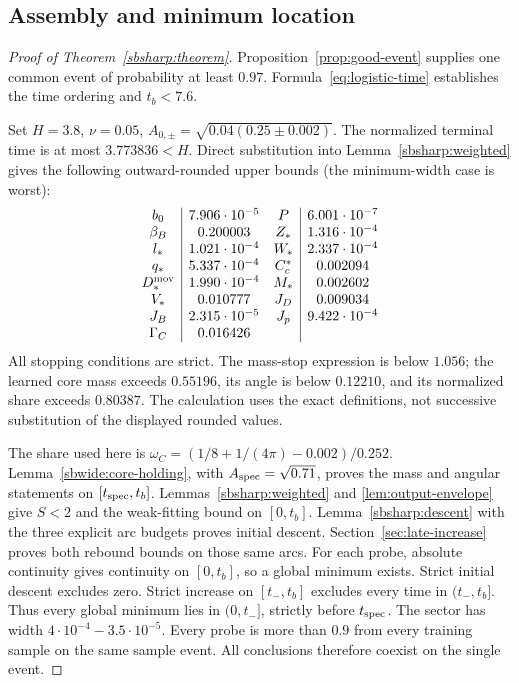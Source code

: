 \documentclass[10pt]{article}
\theoremstyle{remark}\newtheorem{remark}[theorem]{Remark}
\begin{document}
\subsection{Assembly and minimum location}

\begin{proof}[Proof of Theorem~\ref{sbsharp:theorem}]

Proposition~\ref{prop:good-event} supplies one common event of probability
at least $0.97$. Formula~\eqref{eq:logistic-time} establishes the time
ordering and $t_b<7.6$.

Set $H=3.8$, $\nu=0.05$, $A_{0,\pm}=\sqrt{0.04(0.25\pm0.002)}$.
The normalized terminal time is at most $3.773836<H$. Direct
substitution into Lemma~\ref{sbsharp:weighted} gives the following
outward-rounded upper bounds (the minimum-width case is worst):
\[
\begin{array}{c|c@{\quad}c|c}
 b_0&7.906\cdot10^{-5}&P&6.001\cdot10^{-7}\\
 \beta_B&0.200003&Z_*&1.316\cdot10^{-4}\\
 l_*&1.021\cdot10^{-4}&W_*&2.337\cdot10^{-4}\\
 q_*&5.337\cdot10^{-4}&C_c^*&0.002094\\
 D_*^{\rm mov}&1.990\cdot10^{-4}&M_*&0.002602\\
 V_*&0.010777&J_D&0.009034\\
 J_B&2.315\cdot10^{-5}&J_p&9.422\cdot10^{-4}\\
 \Gamma_C&0.016426&&
\end{array}
\]
All stopping conditions are strict. The mass-stop expression is below
$1.056$; the learned core mass exceeds $0.55196$, its angle is below
$0.12210$, and its normalized share exceeds $0.80387$.
The calculation uses the exact definitions, not successive substitution
of the displayed rounded values.



The share used here is
$\omega_C=(1/8+1/(4\pi)-0.002)/0.252$.
Lemma~\ref{sbwide:core-holding}, with $A_{\rm spec}=\sqrt{0.71}$, proves the mass and angular statements
on $[t_{\rm spec},t_b]$. Lemmas~\ref{sbsharp:weighted} and
\ref{lem:output-envelope} give $S<2$ and the weak-fitting bound on
$[0,t_b]$. Lemma~\ref{sbsharp:descent} with the three explicit arc
budgets proves initial descent. Section~\ref{sec:late-increase} proves
both rebound bounds on those same arcs.
For each probe, absolute continuity gives continuity on $[0,t_b]$, so a
global minimum exists. Strict initial descent excludes zero. Strict
increase on $[t_-,t_b]$ excludes every time in $(t_-,t_b]$.
Thus every global minimum lies in $(0,t_-]$, strictly before
$t_{\rm spec}$. The sector has width $4\cdot10^{-4}-3.5\cdot10^{-5}$.
Every probe is more than $0.9$ from every training sample on the same
sample event. All conclusions therefore coexist on the single event.
\end{proof}
\end{document}
